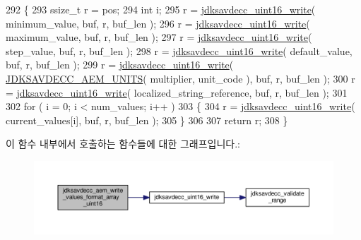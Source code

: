 \begin{DoxyCode}
292 \{
293     ssize\_t r = pos;
294     \textcolor{keywordtype}{int} i;
295     r = \hyperlink{group__endian_ga4c0851ce17bde5306fdb04bfb5b75af1}{jdksavdecc\_uint16\_write}( minimum\_value, buf, r, buf\_len );
296     r = \hyperlink{group__endian_ga4c0851ce17bde5306fdb04bfb5b75af1}{jdksavdecc\_uint16\_write}( maximum\_value, buf, r, buf\_len );
297     r = \hyperlink{group__endian_ga4c0851ce17bde5306fdb04bfb5b75af1}{jdksavdecc\_uint16\_write}( step\_value, buf, r, buf\_len );
298     r = \hyperlink{group__endian_ga4c0851ce17bde5306fdb04bfb5b75af1}{jdksavdecc\_uint16\_write}( default\_value, buf, r, buf\_len );
299     r = \hyperlink{group__endian_ga4c0851ce17bde5306fdb04bfb5b75af1}{jdksavdecc\_uint16\_write}( \hyperlink{group__aem__descriptor_gae5f7498f6048b4dda1aca923b0eae0f6}{JDKSAVDECC\_AEM\_UNITS}( 
      multiplier, unit\_code ), buf, r, buf\_len );
300     r = \hyperlink{group__endian_ga4c0851ce17bde5306fdb04bfb5b75af1}{jdksavdecc\_uint16\_write}( localized\_string\_reference, buf, r, buf\_len );
301 
302     \textcolor{keywordflow}{for} ( i = 0; i < num\_values; i++ )
303     \{
304         r = \hyperlink{group__endian_ga4c0851ce17bde5306fdb04bfb5b75af1}{jdksavdecc\_uint16\_write}( current\_values[i], buf, r, buf\_len );
305     \}
306 
307     \textcolor{keywordflow}{return} r;
308 \}
\end{DoxyCode}


이 함수 내부에서 호출하는 함수들에 대한 그래프입니다.\+:
\nopagebreak
\begin{figure}[H]
\begin{center}
\leavevmode
\includegraphics[width=350pt]{group__aem__descriptor_gae0eb98528119e197c0510e0c771cadc1_cgraph}
\end{center}
\end{figure}


